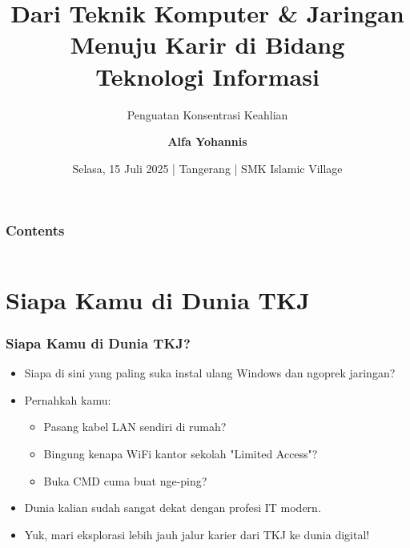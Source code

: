 \documentclass[aspectratio=169, table]{beamer}
\subtitle{Penguatan Konsentrasi
	Keahlian}
\title{\LARGE Dari Teknik Komputer \& Jaringan \\
Menuju Karir di Bidang \\
\vspace{4pt}
Teknologi Informasi
}
\date[Serial]{\footnotesize Selasa, 15 Juli 2025 | Tangerang | SMK Islamic Village}
\author{\textbf{Alfa Yohannis}}
\begin{document}
\frame{\titlepage}


\begin{frame}[fragile]
\frametitle{Contents}
\vspace{20pt}
\begin{columns}[t]
	\tableofcontents[sections={1-4}]
	
	\tableofcontents[sections={5-20}]
\end{columns}
\end{frame}




\section{Siapa Kamu di Dunia TKJ}

\begin{frame}
	\frametitle{Siapa Kamu di Dunia TKJ?}
	\vspace{10pt}
	\begin{itemize}
		\item Siapa di sini yang paling suka instal ulang Windows dan ngoprek jaringan?
		\item Pernahkah kamu:
		\begin{itemize}
			\item Pasang kabel LAN sendiri di rumah?
			\item Bingung kenapa WiFi kantor sekolah "Limited Access"?
			\item Buka CMD cuma buat nge-ping?
		\end{itemize}
		\item Dunia kalian sudah sangat dekat dengan profesi IT modern.
		\item Yuk, mari eksplorasi lebih jauh jalur karier dari TKJ ke dunia digital!
	\end{itemize}
\end{frame}
\end{document}
